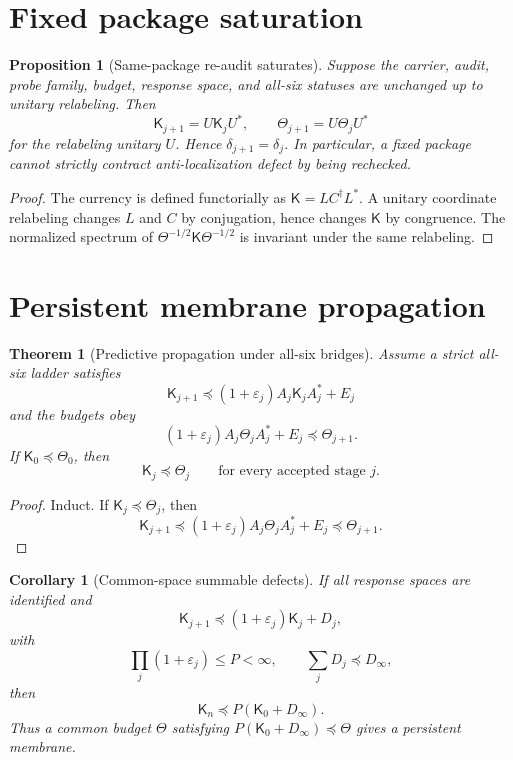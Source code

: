 \documentclass[11pt]{article}
\newtheorem{theorem}{Theorem}
\newtheorem{proposition}{Proposition}
\newtheorem{corollary}{Corollary}
\newcommand{\Kmat}{\mathsf K}
\newcommand{\Tbud}{\Theta}
\newcommand{\Loew}{\preceq}
\begin{document}
\section{Fixed package saturation}
\begin{proposition}[Same-package re-audit saturates]
Suppose the carrier, audit, probe family, budget, response space, and all-six statuses are unchanged up to unitary relabeling.  Then
\[
  \Kmat_{j+1}=U\Kmat_jU^*,\qquad \Tbud_{j+1}=U\Tbud_jU^*
\]
for the relabeling unitary \(U\).  Hence \(\delta_{j+1}=\delta_j\).  In particular, a fixed package cannot strictly contract anti-localization defect by being rechecked.
\end{proposition}

\begin{proof}
The currency is defined functorially as \(\Kmat=L C^\dagger L^*\).  A unitary coordinate relabeling changes \(L\) and \(C\) by conjugation, hence changes \(\Kmat\) by congruence.  The normalized spectrum of \(\Tbud^{-1/2}\Kmat\Tbud^{-1/2}\) is invariant under the same relabeling.
\end{proof}

\section{Persistent membrane propagation}
\begin{theorem}[Predictive propagation under all-six bridges]
Assume a strict all-six ladder satisfies
\[
  \Kmat_{j+1}\Loew (1+\varepsilon_j)A_j\Kmat_jA_j^*+E_j
\]
and the budgets obey
\[
  (1+\varepsilon_j)A_j\Tbud_jA_j^*+E_j\Loew \Tbud_{j+1}.
\]
If \(\Kmat_0\Loew\Tbud_0\), then
\[
  \Kmat_j\Loew\Tbud_j\qquad\text{for every accepted stage }j.
\]
\end{theorem}

\begin{proof}
Induct.  If \(\Kmat_j\Loew\Tbud_j\), then
\[
\Kmat_{j+1}\Loew (1+\varepsilon_j)A_j\Tbud_jA_j^*+E_j\Loew\Tbud_{j+1}.
\]
\end{proof}

\begin{corollary}[Common-space summable defects]
If all response spaces are identified and
\[
  \Kmat_{j+1}\Loew (1+\varepsilon_j)\Kmat_j+D_j,
\]
with
\[
  \prod_j(1+\varepsilon_j)\le P<\infty,
  \qquad
  \sum_jD_j\Loew D_\infty,
\]
then
\[
  \Kmat_n\Loew P(\Kmat_0+D_\infty).
\]
Thus a common budget \(\Tbud\) satisfying \(P(\Kmat_0+D_\infty)\Loew\Tbud\) gives a persistent membrane.
\end{corollary}
\end{document}
